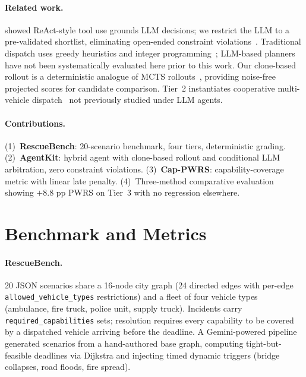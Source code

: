 \documentclass{article}
\begin{document}
\paragraph{Related work.}
\citet{yao2023react} showed ReAct-style tool use grounds LLM decisions;
we restrict the LLM to a pre-validated shortlist, eliminating open-ended
constraint violations~\citep{schick2023toolformer,shinn2023reflexion}.
Traditional dispatch uses greedy heuristics and integer
programming~\citep{zhang2017ems,liu2019multi}; LLM-based planners have not
been systematically evaluated here prior to this work.
Our clone-based rollout is a deterministic analogue of MCTS
rollouts~\citep{browne2012mcts}, providing noise-free projected scores for
candidate comparison.
Tier~2 instantiates cooperative multi-vehicle
dispatch~\citep{stone2000,khamis2015} not previously studied under LLM
agents.

\paragraph{Contributions.}
(1)~\textbf{RescueBench}: 20-scenario benchmark, four tiers, deterministic
grading.
(2)~\textbf{AgentKit}: hybrid agent with clone-based rollout and conditional
LLM arbitration, zero constraint violations.
(3)~\textbf{Cap-PWRS}: capability-coverage metric with linear late penalty.
(4)~Three-method comparative evaluation showing $+8.8$ pp PWRS on Tier~3
with no regression elsewhere.

\section{Benchmark and Metrics}
\label{sec:benchmark}

\paragraph{RescueBench.}
20 JSON scenarios share a 16-node city graph (24 directed edges with
per-edge \texttt{allowed\_vehicle\_types} restrictions) and a fleet of four
vehicle types (ambulance, fire truck, police unit, supply truck).
Incidents carry \texttt{required\_capabilities} sets; resolution requires
every capability to be covered by a dispatched vehicle arriving before the
deadline.
A Gemini-powered pipeline generated scenarios from a hand-authored base
graph, computing tight-but-feasible deadlines via Dijkstra and injecting
timed dynamic triggers (bridge collapses, road floods, fire spread).
\end{document}
